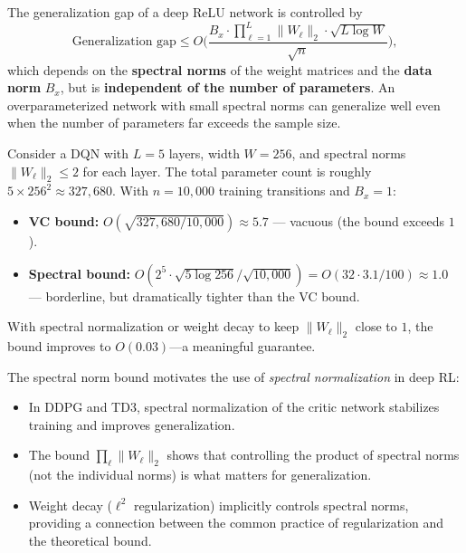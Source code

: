 \documentclass[11pt,a4paper]{article}
\begin{document}
\begin{keyresult}[title={Norm-Based Generalization for Deep Networks}]
The generalization gap of a deep ReLU network is controlled by
\[
  \text{Generalization gap} \le O\biggl(
  \frac{B_x \cdot \prod_{\ell=1}^L \|W_\ell\|_2 \cdot
  \sqrt{L \log W}}{\sqrt{n}} \biggr),
\]
which depends on the \textbf{spectral norms} of the weight matrices
and the \textbf{data norm} $B_x$, but is \textbf{independent of the
number of parameters}.  An overparameterized network with small
spectral norms can generalize well even when the number of parameters
far exceeds the sample size.
\end{keyresult}

\begin{example}
\label{ex:dqn-bound}
Consider a DQN with $L = 5$ layers, width $W = 256$, and spectral
norms $\|W_\ell\|_2 \le 2$ for each layer.  The total parameter count
is roughly $5 \times 256^2 \approx 327{,}680$.  With $n = 10{,}000$
training transitions and $B_x = 1$:
\begin{itemize}[nosep]
  \item \textbf{VC bound:} $O(\sqrt{327{,}680 / 10{,}000})
    \approx 5.7$ --- vacuous (the bound exceeds $1$).
  \item \textbf{Spectral bound:} $O(2^5 \cdot \sqrt{5 \log 256}
    / \sqrt{10{,}000}) = O(32 \cdot 3.1 / 100) \approx 1.0$ ---
    borderline, but dramatically tighter than the VC bound.
\end{itemize}
With spectral normalization or weight decay to keep $\|W_\ell\|_2$
close to $1$, the bound improves to $O(0.03)$---a meaningful guarantee.
\end{example}

\begin{rlconnection}[title={Spectral Normalization in Deep RL}]
The spectral norm bound motivates the use of \emph{spectral
normalization} in deep RL:
\begin{itemize}[nosep]
  \item In DDPG and TD3, spectral normalization of the critic
    network stabilizes training and improves generalization.
  \item The bound $\prod_\ell \|W_\ell\|_2$ shows that controlling
    the product of spectral norms (not the individual norms) is
    what matters for generalization.
  \item Weight decay ($\ell^2$ regularization) implicitly controls
    spectral norms, providing a connection between the common
    practice of regularization and the theoretical bound.
\end{itemize}
\end{rlconnection}
\end{document}

